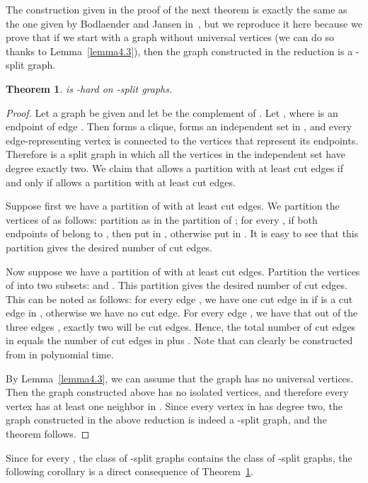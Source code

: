 \documentclass[
final
]{dmtcs-episciences}
\newtheorem{theorem}{Theorem}{\bfseries}{\itshape}
\begin{document}
The construction given in the proof of the next theorem is exactly the same as the one given by  Bodlaender and Jansen in~\cite[Theorem 3.1]{bodlaender}, but we reproduce it here because we prove that if we start with a graph without universal vertices (we can do so thanks to Lemma~\ref{lemma4.3}), then the graph constructed in the reduction is a -split graph.




\begin{theorem}\label{theorem4.4}
{} is {}-hard on -split graphs.		
\end{theorem}
\begin{proof}
Let a graph  be given and let  be the complement of . Let , where   is an endpoint of edge . Then  forms a clique,  forms an independent set in , and every edge-representing vertex  is connected to the vertices that represent its endpoints. Therefore  is a split graph in which all the vertices in the independent set have  degree exactly two. We claim that  allows a partition with at least  cut edges if and only if  allows a partition with at least  cut edges.
		
		Suppose first we have a partition  of  with at least  cut edges. We partition the vertices of  as follows: partition  as in the partition of ; for every , if both endpoints of  belong to , then put  in , otherwise put  in . It is easy to see that this partition gives the desired number of cut edges.
		
		Now suppose we have a partition  of  with at least  cut edges. Partition the vertices of  into two subsets:  and . This partition gives the desired number of cut edges. This can be noted as follows: for every edge , we have one cut edge in  if  is a cut edge in , otherwise we have no cut edge. For every edge , we have that out of the three edges , exactly two will be cut edges. Hence, the total number of cut edges in  equals the number of cut edges in  plus . Note that  can clearly be constructed from  in polynomial time.

By Lemma~\ref{lemma4.3}, we can assume that the graph   has no universal vertices. Then the graph  constructed above has no isolated vertices, and therefore every vertex  has at least one neighbor in . Since every vertex in  has degree two, the graph  constructed in the above reduction is indeed a -split graph, and the theorem follows.
\end{proof}
		


Since for every , the class of  -split graphs contains the class of -split graphs, the following corollary is a direct consequence of Theorem~\ref{theorem4.4}.
		
\end{document}
